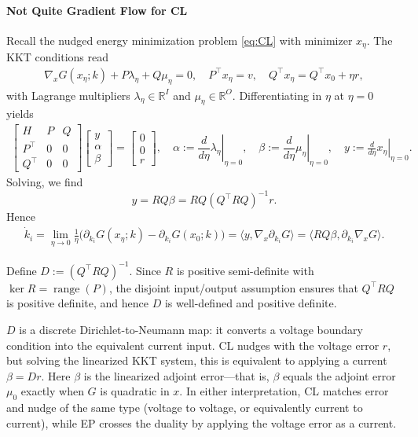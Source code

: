 \documentclass{siamart}
\begin{document}
\paragraph{Not Quite Gradient Flow for CL}
Recall the nudged energy minimization problem \eqref{eq:CL} with minimizer $x_{\eta}$. The KKT conditions read
\begin{align}
\nabla_x G(x_\eta;k) + P\lambda_\eta +Q\mu_\eta = 0,\quad
P^\top x_\eta = v, \quad
Q^\top x_\eta = Q^\top x_0 + \eta r,
\label{eq:kkt-eta-CL}
\end{align}
with Lagrange multipliers $\lambda_\eta \in \mathbb{R}^I$ and $\mu_\eta \in \mathbb{R}^{O}.$
Differentiating in $\eta$ at $\eta=0$ yields
\begin{align}
\begin{bmatrix}
H & P & Q\\
P^\top & 0 & 0 \\
Q^\top & 0 & 0
\end{bmatrix}
\begin{bmatrix}
y\\[2pt]
\alpha\\
\beta
\end{bmatrix}
=
\begin{bmatrix}
0\\
0\\
r
\end{bmatrix},
\quad
\alpha :=\left.\dfrac{d}{d\eta}\lambda_\eta\right|_{\eta=0},
\quad
\beta :=\left.\dfrac{d}{d\eta}\mu_\eta\right|_{\eta=0},
\quad
y:= \left. \frac{d}{d\eta}x_\eta\right |_{\eta=0}.
\label{eq:psi2}
\end{align}
Solving, we find
\[
y =R Q\beta= R Q (Q^\top RQ)^{-1}r.
\]
Hence
\begin{align}
\dot{k}_i= \lim_{\eta\to 0}\frac{1}{\eta}\Big(\partial_{k_i}G(x_\eta;k)-\partial_{k_i}G(x_0;k)\Big)
= \big\langle y, \nabla_x \partial_{k_i}G\big\rangle
= \big\langle R Q \beta,\partial_{k_i}\nabla_x G\big\rangle.
\label{eq:dynamics-CL}
\end{align}

Define $D:=(Q^\top RQ)^{-1}$. Since $R$ is positive semi-definite with $\ker R = \operatorname{range}(P)$, the disjoint input/output assumption ensures that $Q^\top RQ$ is positive definite, and hence $D$ is well-defined and positive definite.

\begin{remark}
$D$ is a discrete Dirichlet-to-Neumann map: it converts a voltage boundary condition into the equivalent current input. CL nudges with the voltage error $r$, but solving the linearized KKT system, this is equivalent to applying a current $\beta = Dr$. Here $\beta$ is the linearized adjoint error---that is, $\beta$ equals the adjoint error $\mu_0$ exactly when $G$ is quadratic in $x$. In either interpretation, CL matches error and nudge of the same type (voltage to voltage, or equivalently current to current), while EP crosses the duality by applying the voltage error as a current.
\end{remark} 
\end{document}
